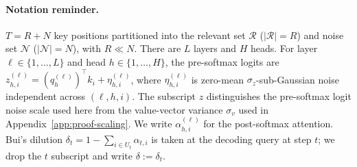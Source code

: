 \documentclass{article}
\begin{document}
\paragraph{Notation reminder.}
$T = R + N$ key positions partitioned into the relevant set
$\mathcal{R}$ ($|\mathcal{R}| = R$) and noise set $\mathcal{N}$
($|\mathcal{N}| = N$), with $R \ll N$. There are $L$ layers and $H$
heads. For layer $\ell \in \{1, \dots, L\}$ and head $h \in \{1, \dots,
H\}$, the pre-softmax logits are $z^{(\ell)}_{h, i} = (q^{(\ell)}_h)^\top
k_i + \eta^{(\ell)}_{h, i}$, where $\eta^{(\ell)}_{h, i}$ is zero-mean
$\sigma_z$-sub-Gaussian noise independent across $(\ell, h, i)$. The
subscript $z$ distinguishes the pre-softmax logit noise scale used here
from the value-vector variance $\sigma_v$ used in
Appendix~\ref{app:proof-scaling}. We write $\alpha^{(\ell)}_{h, i}$ for
the post-softmax attention. Bui's dilution $\delta_t = 1 - \sum_{i \in
U_t} \alpha_{t, i}$ is taken at the decoding query at step $t$; we drop
the $t$ subscript and write $\delta := \delta_t$.
\end{document}
